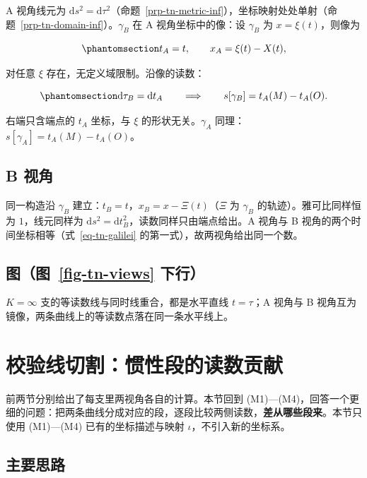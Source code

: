 \documentclass[
  chinese,
  a4paper,
  UTF8,
  12pt,
  oneside,
  openany]{ctexbook}
\theoremstyle{plain}
\theoremstyle{plain}
\theoremstyle{plain}
\theoremstyle{definition}
\theoremstyle{plain}
\theoremstyle{plain}
\theoremstyle{remark}
\begin{document}
A 视角线元为
\(\mathrm{d}s^{2}=\mathrm{d}\tau^{2}\)（命题~\ref{prp-tn-metric-inf}），坐标映射处处单射（命题~\ref{prp-tn-domain-inf}）。\(\gamma_B\)
在 A 视角坐标中的像：设 \(\gamma_B\) 为 \(x=\xi(t)\)，则像为

\begin{equation}\protect\phantomsection\label{eq-tn-image-inf}{
t_A=t,\qquad x_A=\xi(t)-X(t),
}\end{equation}

对任意 \(\xi\) 存在，无定义域限制。沿像的读数：

\begin{equation}\protect\phantomsection\label{eq-tn-read-inf}{
\mathrm{d}\tau_B=\mathrm{d}t_A
\qquad\Longrightarrow\qquad
s[\gamma_B]=t_A(M)-t_A(O).
}\end{equation}

右端只含端点的 \(t_A\) 坐标，与 \(\xi\) 的形状无关。\(\gamma_A\)
同理：\(s[\gamma_A]=t_A(M)-t_A(O)\)。

\subsection{B 视角}\label{b-ux89c6ux89d2-1}

同一构造沿 \(\gamma_B\) 建立：\(t_B=t\)，\(x_B=x-\Xi(t)\)（\(\Xi\) 为
\(\gamma_B\) 的轨迹）。雅可比同样恒为 \(1\)，线元同样为
\(\mathrm{d}s^{2}=\mathrm{d}t_B^{2}\)，读数同样只由端点给出。A 视角与 B
视角的两个时间坐标相等（式~\ref{eq-tn-galilei}
的第一式），故两视角给出同一个数。

\subsection{\texorpdfstring{图（图~\ref{fig-tn-views}
下行）}{图（图~ 下行）}}\label{ux56fefig-tn-views-ux4e0bux884c}

\(K=\infty\) 支的等读数线与同时线重合，都是水平直线 \(t=\tau\)；A 视角与
B 视角互为镜像，两条曲线上的等读数点落在同一条水平线上。

\section{校验线切割：惯性段的读数贡献}\label{sec-tn-cut}

前两节分别给出了每支里两视角各自的计算。本节回到
(M1)---(M4)，回答一个更细的问题：把两条曲线分成对应的段，逐段比较两侧读数，\textbf{差从哪些段来}。本节只使用
(M1)---(M4) 已有的坐标描述与映射 \(\iota\)，不引入新的坐标系。

\subsection{主要思路}\label{ux4e3bux8981ux601dux8def}
\end{document}
